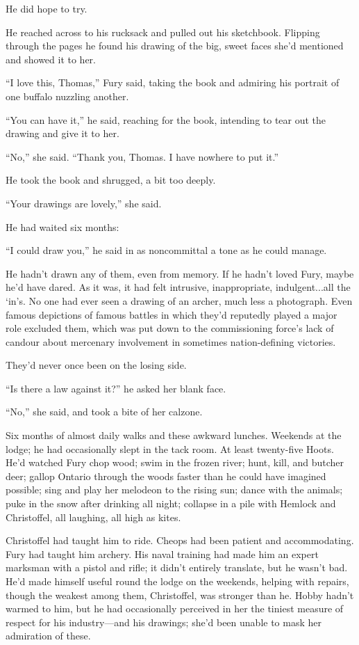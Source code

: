 \documentclass[11pt,a5paper]{article}
\begin{document}
He did hope to try.

He reached across to his rucksack and pulled out his sketchbook. Flipping through the pages he found his drawing of the big, sweet faces she'd mentioned and showed it to her.

``I love this, Thomas,'' Fury said, taking the book and admiring his portrait of one buffalo nuzzling another.

``You can have it,'' he said, reaching for the book, intending to tear out the drawing and give it to her.

``No,'' she said. ``Thank you, Thomas. I have nowhere to put it.''

He took the book and shrugged, a bit too deeply.

``Your drawings are lovely,'' she said.

He had waited six months:

``I could draw you,'' he said in as noncommittal a tone as he could manage.

He hadn't drawn any of them, even from memory. If he hadn't loved Fury, maybe he'd have dared. As it was, it had felt intrusive, inappropriate, indulgent...all the `in's. No one had ever seen a drawing of an archer, much less a photograph. Even famous depictions of famous battles in which they'd reputedly played a major role excluded them, which was put down to the commissioning force's lack of candour about mercenary involvement in sometimes nation-defining victories.

They'd never once been on the losing side.

``Is there a law against it?'' he asked her blank face.

``No,'' she said, and took a bite of her calzone.

Six months of almost daily walks and these awkward lunches. Weekends at the lodge; he had occasionally slept in the tack room. At least twenty-five Hoots. He'd watched Fury chop wood; swim in the frozen river; hunt, kill, and butcher deer; gallop Ontario through the woods faster than he could have imagined possible; sing and play her melodeon to the rising sun; dance with the animals; puke in the snow after drinking all night; collapse in a pile with Hemlock and Christoffel, all laughing, all high as kites.

Christoffel had taught him to ride. Cheops had been patient and accommodating. Fury had taught him archery. His naval training had made him an expert marksman with a pistol and rifle; it didn't entirely translate, but he wasn't bad. He'd made himself useful round the lodge on the weekends, helping with repairs, though the weakest among them, Christoffel, was stronger than he. Hobby hadn't warmed to him, but he had occasionally perceived in her the tiniest measure of respect for his industry---and his drawings; she'd been unable to mask her admiration of these.
\end{document}
